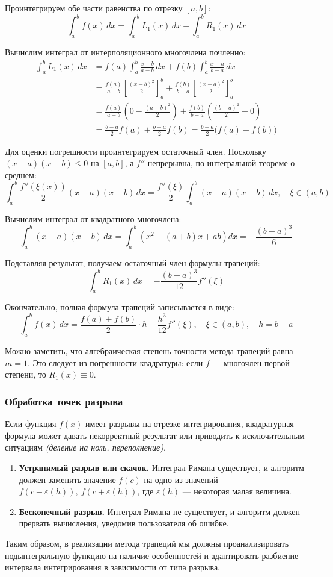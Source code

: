 Проинтегрируем обе части равенства по отрезку \( [a,b] \):
\[
  \int_a^b f(x)\,dx = \int_a^b L_1(x)\,dx + \int_a^b R_1(x)\,dx
\]

Вычислим интеграл от интерполяционного многочлена почленно:
\[
  \begin{aligned}
    \int_a^b L_1(x)\,dx &= f(a)\int_a^b \frac{x-b}{a-b}\,dx + f(b)\int_a^b \frac{x-a}{b-a}\,dx \\
    &= \frac{f(a)}{a-b} \left[ \frac{(x-b)^2}{2} \right]_a^b + \frac{f(b)}{b-a} \left[ \frac{(x-a)^2}{2} \right]_a^b \\
    &= \frac{f(a)}{a-b} \left( 0 - \frac{(a-b)^2}{2} \right) + \frac{f(b)}{b-a} \left( \frac{(b-a)^2}{2} - 0 \right) \\
    &= \frac{b-a}{2}f(a) + \frac{b-a}{2}f(b) = \frac{b-a}{2}\bigl(f(a)+f(b)\bigr)
  \end{aligned}
\]

Для оценки погрешности проинтегрируем остаточный член. Поскольку \((x-a)(x-b) \le 0\) на \([a,b]\), а \(f''\) непрерывна, по интегральной теореме о среднем:
\[
  \int_a^b \dfrac{f''(\xi(x))}{2}(x-a)(x-b)\,dx = \frac{f''(\xi)}{2} \int_a^b (x-a)(x-b)\,dx, \quad \xi \in (a,b)
\]

Вычислим интеграл от квадратного многочлена:
\[
  \int_a^b (x-a)(x-b)\,dx = \int_a^b \left(x^2 - (a+b)x + ab\right)dx = -\frac{(b-a)^3}{6}
\]

Подставляя результат, получаем остаточный член формулы трапеций:
\[
  \int_a^b R_1(x)\,dx = -\frac{(b-a)^3}{12} f''(\xi)
\]

Окончательно, полная формула трапеций записывается в виде:
\[
  \int_a^b f(x)\,dx = \frac{f(a)+f(b)}{2}\cdot h - \frac{h^3}{12} f''(\xi), \quad \xi \in (a,b), \quad h=b-a
\]

Можно заметить, что алгебраическая степень точности метода трапеций равна $m = 1$. Это следует из погрешности квадратуры: если \( f \) --- многочлен первой степени, то \( R_1(x)\equiv 0 \).

\subsubsection{Обработка точек разрыва}

Если функция $f(x)$ имеет разрывы на отрезке интегрирования, квадратурная формула может давать некорректный результат или приводить к исключительным ситуациям \textit{(деление на ноль, переполнение)}.

\begin{enumerate}
  \item \textbf{Устранимый разрыв или скачок.} Интеграл Римана существует, и алгоритм должен заменить значение $f(c)$ на одно из значений $f(c-\varepsilon(h)),\ f(c+\varepsilon(h))$, где $\varepsilon(h)$ --- некоторая малая величина.

  \item \textbf{Бесконечный разрыв.} Интеграл Римана не существует, и алгоритм должен прервать вычисления, уведомив пользователя об ошибке.
\end{enumerate}

Таким образом, в реализации метода трапеций мы должны проанализировать подынтегральную функцию на наличие особенностей и адаптировать разбиение интервала интегрирования в зависимости от типа разрыва.